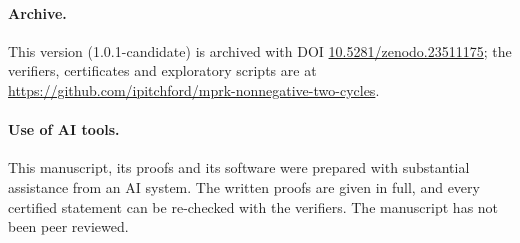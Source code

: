 \documentclass[11pt,a4paper]{article}
\theoremstyle{plain}
\theoremstyle{definition}
\begin{document}
\paragraph{Archive.} This version (1.0.1-candidate) is archived with DOI \href{https://doi.org/10.5281/zenodo.23511175}{10.5281/zenodo.23511175}; the verifiers, certificates and exploratory scripts are at \url{https://github.com/ipitchford/mprk-nonnegative-two-cycles}.

\paragraph{Use of AI tools.} This manuscript, its proofs and its software were prepared with substantial assistance from an AI system. The written proofs are given in full, and every certified statement can be re-checked with the verifiers. The manuscript has not been peer reviewed.
\end{document}
